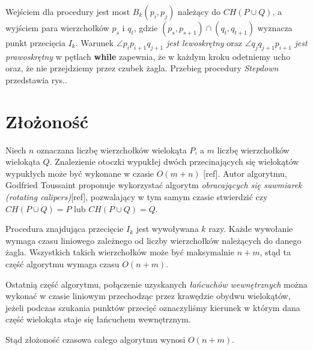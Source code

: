 Wejściem dla procedury jest most $B_k(p_i,p_j)$ należący do $CH(P \cup
Q)$, a wyjściem para wierzchołków $p_s$ i $q_t$, gdzie $(p_s,p_{s+1})
\cap (q_t,q_{t+1})$ wyznacza punkt przecięcia $I_k$. Warunek $\angle
p_{i}p_{i+1}q_{j+1}$ \emph{jest lewoskrętny} oraz $\angle
q_{j}q_{j+1}p_{i+1}$ \emph{jest prawoskrętny} w pętlach \textbf{while}
zapewnia, że w każdym kroku odetniemy ucho oraz, że nie przejdziemy
przez czubek żagla. Przebieg procedury \emph{Stepdown} przedstawia
rys..

\section{Złożoność}
Niech $n$ oznaczana liczbę wierzchołków wielokąta $P$, a $m$ liczbę
wierzchołków wielokąta $Q$. Znalezienie otoczki wypukłej dwóch
przecinających się wielokątów wypukłych może być wykonane w czasie
$O(m + n)$ [ref]. Autor algorytmu, Godfried Toussaint proponuje
wykorzystać algorytm \emph{obracających się suwmiarek (rotating
  calipers)}[ref], pozwalający w tym samym czasie stwierdzić czy $CH(P
\cup Q) = P$ lub $CH(P \cup Q) = Q$.

Procedura znajdująca przecięcie $I_k$ jest wywoływana $k$ razy. Każde
wywołanie wymaga czasu liniowego zależnego od liczby wierzchołków
należących do danego żagla. Wszystkich takich wierzchołków może być
maksymalnie $n + m$, stąd ta część algorytmu wymaga czasu $O(n + m)$.

Ostatnią część algorytmu, połączenie uzyskanych \emph{łańcuchów
  wewnętrznych} można wykonać w czasie liniowym przechodząc przez
krawędzie obydwu wielokątów, jeżeli podczas szukania punktów przecięć
oznaczyliśmy kierunek w którym dana część wielokąta staje się
łańcuchem wewnętrznym.

Stąd złożoność czasowa całego algorytmu wynosi $O(n + m)$.

